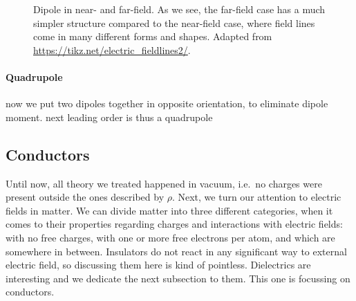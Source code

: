 \documentclass[../class_mech_main.tex]{subfiles}
\begin{document}
\begin{figure}
    \centering

    \hspace*{0.2\textwidth}%

    \caption{Dipole in near- and far-field. As we see, the far-field case has a much simpler structure compared to the near-field case, where field lines come in many different forms and shapes. Adapted from \url{https://tikz.net/electric_fieldlines2/}.}
    \label{fig:dipoles}
\end{figure}



            \paragraph{Quadrupole}
now we put two dipoles together in opposite orientation, to eliminate dipole moment. next leading order is thus a quadrupole



        \subsection{Conductors}
Until now, all theory we treated happened in vacuum, i.e.~no charges were present outside the ones described by $\rho$. Next, we turn our attention to electric fields in matter. We can divide matter into three different categories, when it comes to their properties regarding charges and interactions with electric fields:  with no free charges,  with one or more free electrons per atom, and  which are somewhere in between. Insulators do not react in any significant way to external electric field, so discussing them here is kind of pointless. Dielectrics are interesting and we dedicate the next subsection to them. This one is focussing on conductors.
\end{document}
